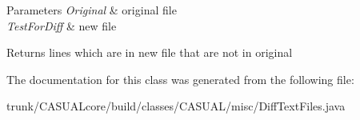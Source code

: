 \begin{DoxyParams}{Parameters}
{\em Original} & original file \\
\hline
{\em Test\-For\-Diff} & new file \\
\hline
\end{DoxyParams}
\begin{DoxyReturn}{Returns}
lines which are in new file that are not in original 
\end{DoxyReturn}


The documentation for this class was generated from the following file\-:\begin{DoxyCompactItemize}
\item 
trunk/\-C\-A\-S\-U\-A\-Lcore/build/classes/\-C\-A\-S\-U\-A\-L/misc/Diff\-Text\-Files.\-java\end{DoxyCompactItemize}
